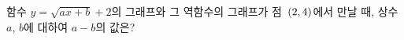 함수 $y=\sqrt{ax+b}+2$의 그래프와 그 역함수의 그래프가 점~$(2{,}\mkern3mu\mathopen{}4)$에서 만날 때, 상수 $a$, $b$에 대하여 $a-b$의 값은?
